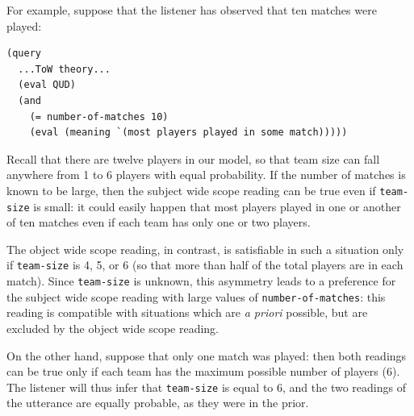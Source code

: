 \documentclass[12pt]{article}
\begin{document}
For example, suppose that the listener has observed that ten matches were played:
\begin{lstlisting}
(query
  ...ToW theory...
  (eval QUD)
  (and 
    (= number-of-matches 10)
    (eval (meaning `(most players played in some match)))))
\end{lstlisting}
Recall that there are twelve players in our model, so that team size can fall anywhere from 1 to 6 players with equal probability. 
If the number of matches is known to be large, then the subject wide scope reading can be true even if \lstinline{team-size} is small: it could easily happen that most players played in one or another of ten matches even if each team has only one or two players. 

The object wide scope reading, in contrast, is satisfiable in such a situation only if \lstinline{team-size} is 4, 5, or 6 (so that more than half of the total players are in each match). 
Since \lstinline{team-size} is unknown, this asymmetry leads to a preference for the subject wide scope reading with large values of \lstinline{number-of-matches}: this reading is compatible with situations which are \emph{a priori} possible, but are excluded by the object wide scope reading. 

On the other hand, suppose that only one match was played: then both readings can be true only if each team has the maximum possible number of players (6). 
The listener will thus infer that \lstinline{team-size} is equal to 6, and the two readings of the utterance are equally probable, as they were in the prior.
\end{document}
